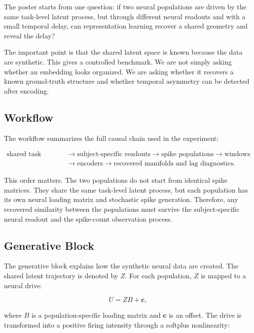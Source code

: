 \documentclass[11pt]{article}
\begin{document}
The poster starts from one question: if two neural populations are driven by
the same task-level latent process, but through different neural readouts and
with a small temporal delay, can representation learning recover a shared
geometry and reveal the delay?

The important point is that the shared latent space is known because the data
are synthetic. This gives a controlled benchmark. We are not simply asking
whether an embedding looks organized. We are asking whether it recovers a
known ground-truth structure and whether temporal asymmetry can be detected
after encoding.

\subsection{Workflow}

The workflow summarizes the full causal chain used in the experiment:

\begin{align}
\text{shared task latent}
&\rightarrow
\text{subject-specific readouts}
\rightarrow
\text{spike populations}
\rightarrow
\text{windows}
\\
&\rightarrow
\text{encoders}
\rightarrow
\text{recovered manifolds and lag diagnostics}.
\end{align}

This order matters. The two populations do not start from identical spike
matrices. They share the same task-level latent process, but each population
has its own neural loading matrix and stochastic spike generation. Therefore,
any recovered similarity between the populations must survive the
subject-specific neural readout and the spike-count observation process.

\subsection{Generative Block}

The generative block explains how the synthetic neural data are created. The
shared latent trajectory is denoted by $Z$. For each population, $Z$ is mapped
to a neural drive:

\begin{equation}
U = ZB + \bm{c},
\end{equation}

where $B$ is a population-specific loading matrix and $\bm{c}$ is an offset.
The drive is transformed into a positive firing intensity through a softplus
nonlinearity:
\end{document}
